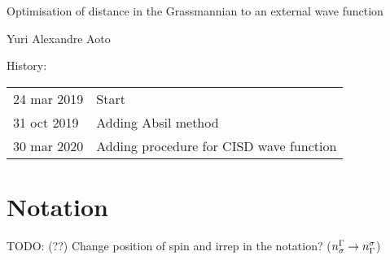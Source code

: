 \documentclass[a4paper,11pt]{article}
\begin{document}
\begin{center}
  {\LARGE Optimisation of distance in the Grassmannian to an external wave function}\vspace{1.0cm}

  {\Large Yuri Alexandre Aoto}
\end{center}
{History:
  
  \begin{tabular}{l@{ - }l}
    24 mar 2019 & Start\\
    31 oct 2019 & Adding Absil method\\
    30 mar 2020 & Adding procedure for CISD wave function\\
  \end{tabular}
}\vspace{3cm}


\section{Notation}

TODO: (??) Change position of spin and irrep in the notation? ($n_\sigma^{\Gamma} \to n_{\Gamma}^\sigma$)
\end{document}
